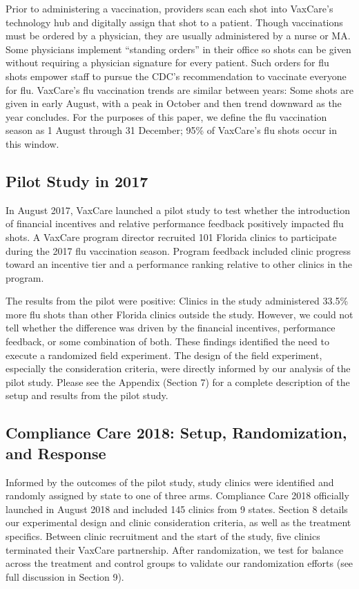  Prior to administering a vaccination, providers scan each shot into VaxCare’s technology hub and digitally assign that shot to a patient. Though vaccinations must be ordered by a physician, they are usually administered by a nurse or MA. Some physicians implement “standing orders” in their office so shots can be given without requiring a physician signature for every patient. Such orders for flu shots empower staff to pursue the CDC’s recommendation to vaccinate everyone for flu. VaxCare’s flu vaccination trends are similar between years: Some shots are given in early August, with a peak in October and then trend downward as the year concludes. For the purposes of this paper, we define the flu vaccination season as 1 August through 31 December; 95\% of VaxCare’s flu shots occur in this window. 

 \subsection{Pilot Study in 2017}
 In August 2017, VaxCare launched a pilot study to test whether the introduction of financial incentives and relative performance feedback positively impacted flu shots. A VaxCare program director recruited 101 Florida clinics to participate during the 2017 flu vaccination season. Program feedback included clinic progress toward an incentive tier and a performance ranking relative to other clinics in the program.
 
 The results from the pilot were positive: Clinics in the study administered 33.5\% more flu shots than other Florida clinics outside the study. However, we could not tell whether the difference was driven by the financial incentives, performance feedback, or some combination of both. These findings identified the need to execute a randomized field experiment. The design of the field experiment, especially the consideration criteria, were directly informed by our analysis of the pilot study. Please see the Appendix (Section 7) for a complete description of the setup and results from the pilot study.

 \subsection{Compliance Care 2018: Setup, Randomization, and Response} \label{cc_setup}
 Informed by the outcomes of the pilot study, study clinics were identified and randomly assigned by state to one of three arms. Compliance Care 2018 officially launched in August 2018 and included 145 clinics from 9 states. Section 8 details our experimental design and clinic consideration criteria, as well as the treatment specifics. Between clinic recruitment and the start of the study, five clinics terminated their VaxCare partnership. After randomization, we test for balance across the treatment and control groups to validate our randomization efforts (see full discussion in Section 9).
 
